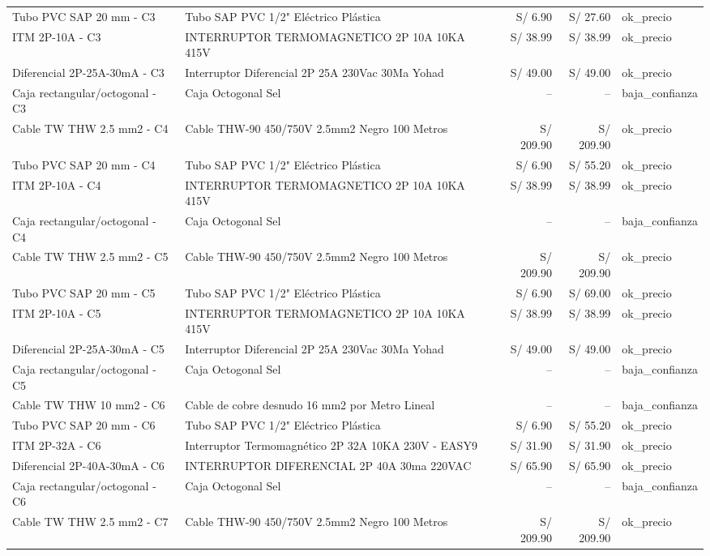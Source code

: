 \documentclass[11pt,a4paper]{article}
\begin{document}
\begin{longtable}{p{} p{} r r p{}}
Tubo PVC SAP 20 mm - C3 & Tubo SAP PVC 1/2" Eléctrico Plástica & S/ 6.90 & S/ 27.60 & ok\_precio \\
ITM 2P-10A - C3 & INTERRUPTOR TERMOMAGNETICO 2P 10A 10KA 415V & S/ 38.99 & S/ 38.99 & ok\_precio \\
Diferencial 2P-25A-30mA - C3 & Interruptor Diferencial 2P 25A 230Vac 30Ma Yohad & S/ 49.00 & S/ 49.00 & ok\_precio \\
Caja rectangular/octogonal - C3 & Caja Octogonal Sel & -- & -- & baja\_confianza \\
Cable TW THW 2.5 mm2 - C4 & Cable THW-90 450/750V 2.5mm2 Negro 100 Metros & S/ 209.90 & S/ 209.90 & ok\_precio \\
Tubo PVC SAP 20 mm - C4 & Tubo SAP PVC 1/2" Eléctrico Plástica & S/ 6.90 & S/ 55.20 & ok\_precio \\
ITM 2P-10A - C4 & INTERRUPTOR TERMOMAGNETICO 2P 10A 10KA 415V & S/ 38.99 & S/ 38.99 & ok\_precio \\
Caja rectangular/octogonal - C4 & Caja Octogonal Sel & -- & -- & baja\_confianza \\
Cable TW THW 2.5 mm2 - C5 & Cable THW-90 450/750V 2.5mm2 Negro 100 Metros & S/ 209.90 & S/ 209.90 & ok\_precio \\
Tubo PVC SAP 20 mm - C5 & Tubo SAP PVC 1/2" Eléctrico Plástica & S/ 6.90 & S/ 69.00 & ok\_precio \\
ITM 2P-10A - C5 & INTERRUPTOR TERMOMAGNETICO 2P 10A 10KA 415V & S/ 38.99 & S/ 38.99 & ok\_precio \\
Diferencial 2P-25A-30mA - C5 & Interruptor Diferencial 2P 25A 230Vac 30Ma Yohad & S/ 49.00 & S/ 49.00 & ok\_precio \\
Caja rectangular/octogonal - C5 & Caja Octogonal Sel & -- & -- & baja\_confianza \\
Cable TW THW 10 mm2 - C6 & Cable de cobre desnudo 16 mm2 por Metro Lineal & -- & -- & baja\_confianza \\
Tubo PVC SAP 20 mm - C6 & Tubo SAP PVC 1/2" Eléctrico Plástica & S/ 6.90 & S/ 55.20 & ok\_precio \\
ITM 2P-32A - C6 & Interruptor Termomagnético 2P 32A 10KA 230V - EASY9 & S/ 31.90 & S/ 31.90 & ok\_precio \\
Diferencial 2P-40A-30mA - C6 & INTERRUPTOR DIFERENCIAL 2P 40A 30ma 220VAC & S/ 65.90 & S/ 65.90 & ok\_precio \\
Caja rectangular/octogonal - C6 & Caja Octogonal Sel & -- & -- & baja\_confianza \\
Cable TW THW 2.5 mm2 - C7 & Cable THW-90 450/750V 2.5mm2 Negro 100 Metros & S/ 209.90 & S/ 209.90 & ok\_precio \\

\end{longtable}
\end{document}
